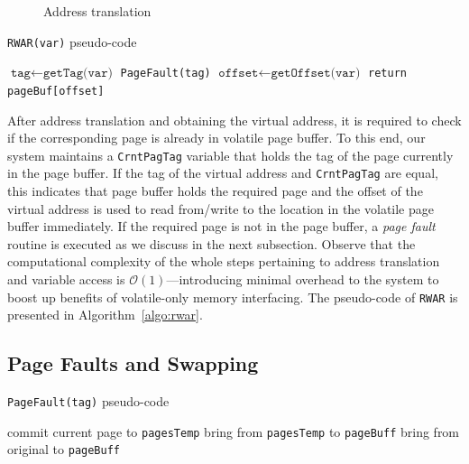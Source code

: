 \begin{figure}
	\centering
	\caption{Address translation}
	\label{fig:address-translation}
\end{figure}

\begin{algorithm}[t]
	\caption{\texttt{RWAR(var)} pseudo-code}
	\label{algo:rwar}
	\scriptsize
	\begin{algorithmic}[1]
		\State $\texttt{tag}\leftarrow \texttt{getTag(var)}$ 
			
		\State	\texttt{PageFault(tag)} 
		\EndIf
				\State $\texttt{offset}\leftarrow \texttt{getOffset(var)}$ 		
		\State \texttt{return pageBuf[offset]}  
	\end{algorithmic}
\end{algorithm}


After address translation and obtaining the virtual address, it is required to check if the corresponding page is already in volatile page buffer. To this end, our system maintains a \texttt{CrntPagTag} variable that holds the tag of the page currently in the page buffer. If the tag of the virtual address and \texttt{CrntPagTag} are equal, this indicates that page buffer holds the required page and the offset of the virtual address is used to read from/write to the location in the volatile page buffer immediately. If the required page is not in the page buffer, a \emph{page fault} routine is executed as we discuss in the next subsection. Observe that the computational complexity of the whole steps pertaining to address translation and variable access is $\mathcal{O}(1)$---introducing minimal overhead to the system to boost up benefits of volatile-only memory interfacing. The pseudo-code of \texttt{RWAR} is presented in Algorithm~\ref{algo:rwar}.


\subsection{Page Faults and Swapping}

\begin{algorithm}[t]
	\caption{\texttt{PageFault(tag)} pseudo-code}
	\label{algo:pagefault}
	\scriptsize
	\begin{algorithmic}[1]
			
		\State commit current page to \texttt{pagesTemp}
		\EndIf
			
		\State bring from \texttt{pagesTemp} to \texttt{pageBuff} 
		\Else
		\State bring from original to \texttt{pageBuff} 
		\EndIf 
	\end{algorithmic}
\end{algorithm}

